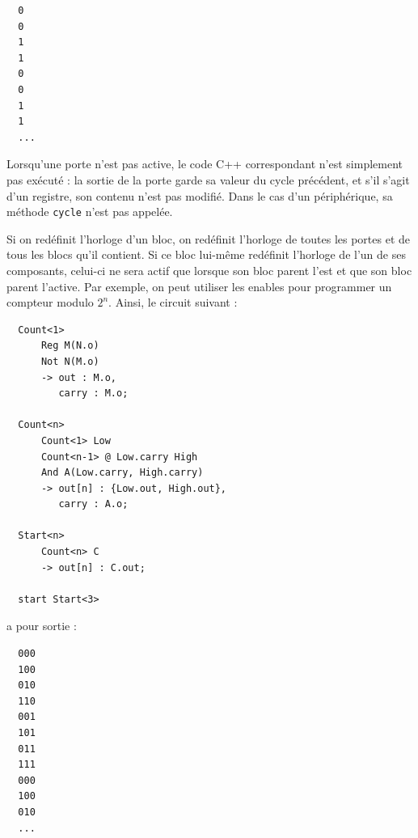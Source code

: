 \documentclass[13pt]{article}
\begin{document}
\begin{verbatim}
  0
  0
  1
  1
  0
  0
  1
  1
  ...
\end{verbatim}
Lorsqu'une porte n'est pas active, le code C++ correspondant n'est
simplement pas exécuté : la sortie de la porte garde sa valeur du cycle
précédent, et s'il s'agit d'un registre, son contenu n'est pas
modifié. Dans le cas d'un périphérique, sa méthode \texttt{cycle} n'est pas
appelée.


Si on redéfinit l'horloge d'un bloc, on redéfinit l'horloge de toutes les
portes et de tous les blocs qu'il contient. Si ce bloc lui-même redéfinit
l'horloge de l'un de ses composants, celui-ci ne sera actif que lorsque son
bloc parent l'est et que son bloc parent l'active. Par exemple, on peut
utiliser les enables pour programmer un compteur modulo $2^n$. Ainsi, le circuit
suivant :
\begin{verbatim}
  Count<1>
      Reg M(N.o)
      Not N(M.o)
      -> out : M.o,
         carry : M.o;

  Count<n>
      Count<1> Low
      Count<n-1> @ Low.carry High
      And A(Low.carry, High.carry)
      -> out[n] : {Low.out, High.out},
         carry : A.o;

  Start<n>
      Count<n> C
      -> out[n] : C.out;

  start Start<3>
\end{verbatim}
a pour sortie :
\begin{verbatim}
  000
  100
  010
  110
  001
  101
  011
  111
  000
  100
  010
  ...
\end{verbatim}
\end{document}

